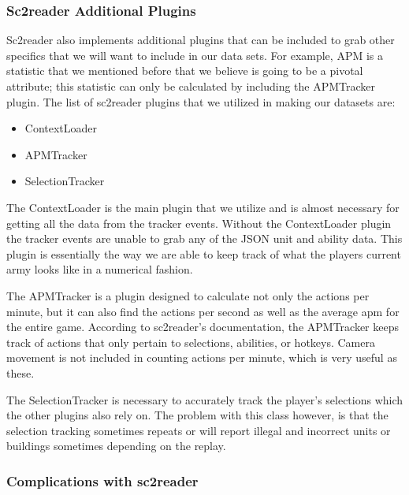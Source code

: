 \documentclass[a4paper,12pt]{report}
\begin{document}
\subsubsection{Sc2reader Additional Plugins}
Sc2reader also implements additional plugins that can be included to grab other specifics that we will want to include in our data sets. For example, APM is a statistic that we mentioned before that we believe is going to be a pivotal attribute; this statistic can only be calculated by including the APMTracker plugin. The list of  sc2reader plugins that we utilized in making our datasets are:
\begin{itemize}
    \setlength\itemsep{-.1cm}
    \item ContextLoader
    \item APMTracker
    \item SelectionTracker
\end{itemize}
The ContextLoader is the main plugin that we utilize and is almost necessary for getting all the data from the tracker events. Without the ContextLoader plugin the tracker events are unable to grab any of the JSON unit and ability data. This plugin is essentially the way we are able to keep track of what the players current army looks like in a numerical fashion.

The APMTracker is a plugin designed to calculate not only the actions per minute, but it can also find the actions per second as well as the average apm for the entire game. According to sc2reader’s documentation, the APMTracker keeps track of actions that only pertain to selections, abilities, or hotkeys. Camera movement is not included in counting actions per minute, which is very useful as these.

The SelectionTracker is necessary to accurately track the player’s selections which the other plugins also rely on. The problem with this class however, is that the selection tracking sometimes repeats or will report illegal and incorrect units or buildings sometimes depending on the replay.

\subsubsection{Complications with sc2reader}
\end{document}
